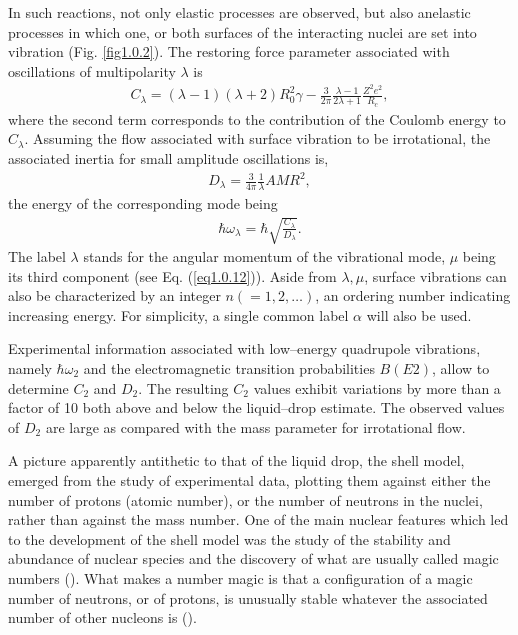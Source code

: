 \documentclass[a4paper,11pt]{book}
\numberwithin{equation}{section}
\numberwithin{figure}{section}
\numberwithin{table}{section}
\begin{document}
In such reactions, not only elastic processes are observed, but also anelastic processes in which one, or both  surfaces of the interacting nuclei are set into vibration (Fig. \ref{fig1.0.2}). The restoring force parameter associated with oscillations of multipolarity $\lambda$ is 
\begin{align}\label{eq1.0.4b}
C_\lambda=(\lambda-1)(\lambda+2)R_0^2\gamma-\frac{3}{2\pi}\frac{\lambda-1}{2\lambda+1}\frac{Z^2e^2}{R_c},
\end{align}
where the second term corresponds to the contribution of the Coulomb energy to $C_\lambda$. Assuming the flow associated with surface vibration to be irrotational, the associated inertia for small amplitude oscillations is, 
\begin{align}\label{eq1.0.5}
D_{\lambda}=\frac{3}{4\pi}\frac{1}{\lambda}AMR^2,
\end{align}
the energy of the corresponding mode being
\begin{align}\label{eq1.0.6}
\hbar\omega_\lambda=\hbar\sqrt{\frac{C_\lambda}{D_\lambda}}.
\end{align}
The label $\lambda$ stands for the angular momentum of the vibrational mode, $\mu$ being its third component (see Eq. (\ref{eq1.0.12})). Aside from $\lambda,\mu$, surface vibrations can also be characterized by an integer $n(=1,2,\dots)$, an ordering number indicating increasing energy. For simplicity, a single common label $\alpha$ will  also be used.


Experimental information associated with low--energy quadrupole vibrations, namely $\hbar\omega_{2}$ and the electromagnetic transition probabilities $B(E2)$, allow to determine $C_2$ and $D_2$. The resulting $C_2$ values exhibit variations by more than a factor of 10 both above and below the liquid--drop estimate. The observed values of $D_2$ are large as compared with the mass parameter for irrotational flow.

A picture apparently antithetic to that of the liquid drop, the shell model, emerged from the study of experimental data, plotting them against either the number of protons (atomic number), or the number of neutrons in the nuclei, rather than against the mass number.
One of the main nuclear features which led to the development of the shell model was the study of the stability and abundance of nuclear species and the discovery of what are usually called magic numbers (\cite{Elsasser:33,Mayer:48,Haxel:49}). What makes a number magic is that a configuration of a magic number of neutrons, or of protons, is unusually stable whatever the associated number of other nucleons is (\cite{Mayer:49,Mayer:49b}).
\end{document}
